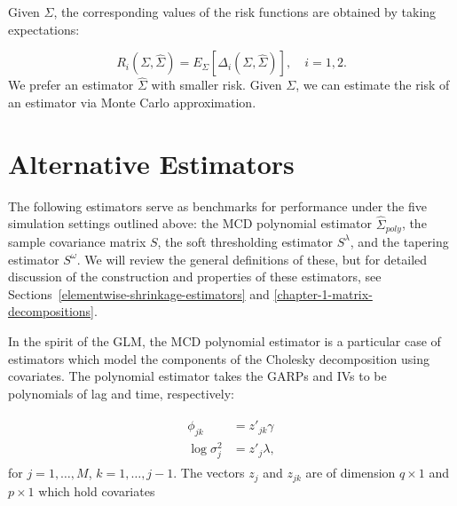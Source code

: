 \bigskip

Given $\Sigma$, the corresponding values of the risk functions are obtained by taking expectations:

\begin{equation*}
R_i \left(\Sigma,\hat{\Sigma}\right) = E_\Sigma\left[\Delta_i\left(\Sigma,\hat{\Sigma}\right)\right], \quad i = 1,2.
\end{equation*}
\noindent
We prefer an estimator $\hat{\Sigma}$ with smaller risk.  Given $\Sigma$, we can estimate the risk of an estimator via Monte Carlo approximation. 


\section{Alternative Estimators}
%
The following estimators serve as benchmarks for performance under the five simulation settings outlined above: the MCD polynomial estimator $\hat{\Sigma}_{poly}$, the sample covariance matrix $S$, the soft thresholding estimator $S^\lambda$, and the tapering estimator $S^\omega$. We will review the general definitions of these, but for detailed discussion of the construction and properties of these estimators, see Sections~\ref{elementwise-shrinkage-estimators} and \ref{chapter-1-matrix-decompositions}.

\bigskip

In the spirit of the GLM, the MCD polynomial estimator is a particular case of estimators which model the components of the Cholesky decomposition using covariates. The polynomial estimator takes the GARPs and IVs to be polynomials of lag and time, respectively:

\begin{align*}
\begin{split}  \label{eq:GARP-IV-parametric-model}
\phi_{jk} &= z'_{jk} \gamma \\
\log \sigma^2_{j} &= z'_{j}\lambda, 
\end{split}
\end{align*}
\noindent
for $j = 1,\dots, M$, $k = 1,\dots, j-1$. The vectors $z_j$ and $z_{jk}$ are of dimension $q \times 1$ and $p \times 1$  which hold covariates

